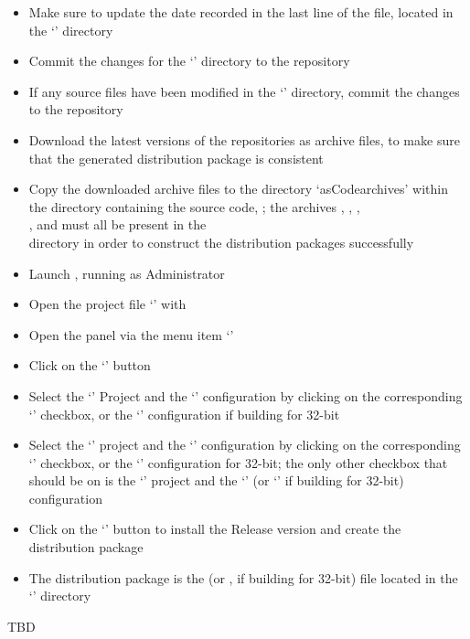\begin{itemize}
\item Make sure to update the date recorded in the last line of the 
file, located in the `' directory
\item\exSp{}Commit the changes for the `' directory to the
 repository
\item\exSp{}If any source files have been modified in the
`' directory, commit the changes to the
 repository
\item\exSp{}Download the latest versions of the  repositories as 
archive files, to make sure that the generated distribution package is consistent
\item\exSp{}Copy the downloaded  archive files to the directory
`asCode{archives}' within the directory containing the \mplusm{} source code,
; the archives ,
, ,\\
,  and
 must all be present in the\\
 directory in order to construct the
distribution packages successfully
\item\exSp{}Launch , running as Administrator
\item\exSp{}Open the project file
`' with
\item\exSp{}Open the  panel via the menu item
`'
\item\exSp{}Click on the `' button
\item\exSp{}Select the `' Project and the `'
configuration by clicking on the corresponding `' checkbox, or the
`' configuration if building for 32-bit
\item\exSp{}Select the `' project and the `'
configuration by clicking on the corresponding `' checkbox, or the
`' configuration for 32-bit; the only other checkbox that should be
on is the `' project and the `' (or
`' if building for 32-bit) configuration
\item\exSp{}Click on the `' button to install the Release version and create
the distribution package
\item\exSp{}The distribution package is the  (or
, if building for 32-bit) file located in the
`' directory
\end{itemize}
\tertiaryEnd
{}
TBD
\tertiaryEnd
\secondaryEnd
\appendixEnd{}
